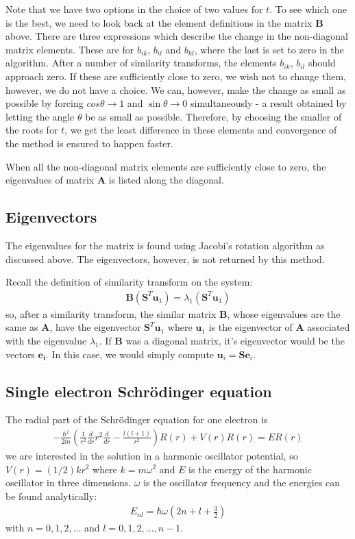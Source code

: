 \documentclass[11pt, a4paper]{article}
\newcommand{\SL}{Schr\"{o}dinger }
\newcommand{\A}{\mathbf{A}}
\renewcommand{\S}{\mathbf{S}}
\newcommand{\B}{\mathbf{B}}
\begin{document}
			Note that we have two options in the choice of two values for $t$. To see which one is the best, we need to look back at the element definitions in the matrix $\B$ above. There are three expressions which describe the change in the non-diagonal matrix elements. These are for $b_{ik}$, $b_{il}$ and $b_{kl}$, where the last is set to zero in the algorithm. After a number of similarity transforms, the elements $b_{ik}$, $b_{il}$ should approach zero. If these are sufficiently close to zero, we wish not to change them, however, we do not have a choice. We can, however, make the change as small as possible by forcing $cos\theta \rightarrow 1$ and $\sin \theta \rightarrow 0$ simultaneously - a result obtained by letting the angle $\theta$ be as small as possible.
			Therefore, by choosing the smaller of the roots for $t$, we get the least difference in these elements and convergence of the method is ensured to happen faster.
			
			When all the non-diagonal matrix elements are sufficiently close to zero, the eigenvalues of matrix $\A$ is listed along the diagonal.
			
		\subsection{Eigenvectors}
			The eigenvalues for the matrix is found using Jacobi's rotation algorithm as discussed above. The eigenvectors, however, is not returned by this method.
			
			Recall the definition of similarity transform on the system:
			\begin{align*}
				\B(\S^T\mathbf{u}_1) = \lambda_1 (\S^T\mathbf{u}_1)
			\end{align*}
			so, after a similarity transform, the similar matrix $\B$, whose eigenvalues are the same as $\A$, have the eigenvector $\S^T\mathbf{u}_1$ where $\mathbf{u}_1$ is the eigenvector of $\A$ associated with the eigenvalue $\lambda_1$. If $\B$ was a diagonal matrix, it's eigenvector would be the vectors $\mathbf{e_i}$. In this case, we would simply compute $\mathbf{u}_i = \S \mathbf{e}_i$. 
		
		
		\subsection{Single electron \SL equation}
			The radial part of the \SL equation for one electron is
			\begin{align}
			-\frac{\hbar^2}{2m} \left( \frac{1}{r^2} \frac{d}{dr} r^2 \frac{d}{dr}-\frac{l(l + 1)}{r^2} \right) R(r) + V(r)R(r) = ER(r) \label{eq: SL one electron, normal}
			\end{align}
			we are interested in the solution in a harmonic oscillator potential, so $V(r) = (1/2)kr^2$ where $k=m\omega^2$ and $E$ is the energy of the harmonic oscillator in three dimensions. $\omega$ is the oscillator frequency and the energies can be found analytically:
			\begin{align*}
				E_{nl} = \hbar \omega \left( 2n+l+\frac{3}{2} \right) 
			\end{align*}
			with $n=0, 1, 2, ...$ and $l = 0, 1, 2, ..., n-1$. 
			
\end{document}
